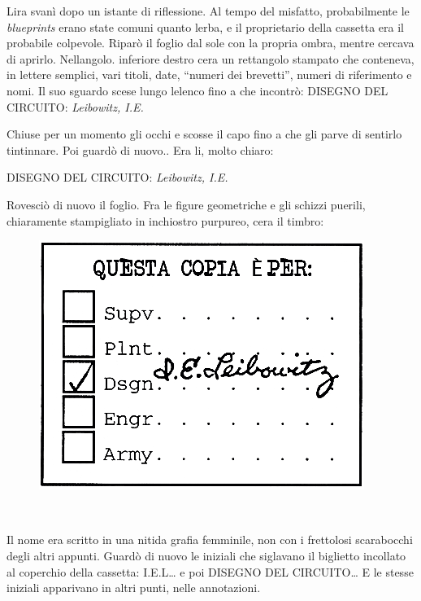 L\textquotesingle ira svanì dopo un istante di riflessione. Al tempo del
misfatto, probabilmente le \emph{blueprints} erano state comuni quanto
l\textquotesingle erba, e il proprietario della cassetta era il
probabile colpevole. Riparò il foglio dal sole con la propria ombra,
mentre cercava di aprirlo. Nell\textquotesingle angolo. inferiore destro
c\textquotesingle era un rettangolo stampato che conteneva, in lettere
semplici, vari titoli, date, ``numeri dei brevetti'', numeri di
riferimento e nomi. Il suo sguardo scese lungo l\textquotesingle elenco
fino a che incontrò: DISEGNO DEL CIRCUITO: \emph{Leibowitz, I.E.}

Chiuse per un momento gli occhi e scosse il capo fino a che gli parve di
sentirlo tintinnare. Poi guardò di nuovo.. Era li, molto chiaro:

\begin{center}
	DISEGNO DEL CIRCUITO: \emph{Leibowitz, I.E.}
\end{center}

Rovesciò di nuovo il foglio. Fra le figure geometriche e gli schizzi
puerili, chiaramente stampigliato in inchiostro purpureo,
c\textquotesingle era il timbro:

\begin{figure}[h]
	\includegraphics[scale=0.4]{Immagini/img_p0299.png}
	\centering
\end{figure}

~

Il nome era scritto in una nitida grafia femminile, non con i frettolosi
scarabocchi degli altri appunti. Guardò di nuovo le iniziali che
siglavano il biglietto incollato al coperchio della cassetta:
I.E.L\ldots{} e poi DISEGNO DEL CIRCUITO\ldots{} E le stesse iniziali
apparivano in altri punti, nelle annotazioni.

